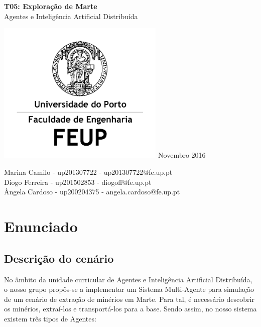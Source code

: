 \documentclass[12pt]{report}
\begin{document}
  \begin{titlepage}
    \begin{center}
        \vspace*{1cm}
        
        \Huge
        \textbf{T05: Exploração de Marte}
        \vspace{0.5cm} \ \\
        \LARGE
        Agentes e Inteligência Artificial Distribuída
        
        \vfill
        
	\includegraphics[width=0.6\textwidth]{FEUP_Logo}
	\break
        \small
        Novembro 2016
        
        \vfill
        
	\vspace{1.5cm}
        \normalsize{
	  Marina Camilo - up201307722 - up201307722@fe.up.pt \\
	  Diogo Ferreira - up201502853 - diogoff@fe.up.pt \\
	  Ângela Cardoso - up200204375 - angela.cardoso@fe.up.pt
        }
        
    \end{center}
  \end{titlepage}

\newpage
\tableofcontents

\clearpage
\chapter{Enunciado}

\section{Descrição do cenário}
No âmbito da unidade curricular de Agentes e Inteligência Artificial Distribuída, o nosso grupo propôs-se a implementar um Sistema Multi-Agente para simulação de um cenário de extração de minérios em Marte. Para tal, é necessário descobrir os minérios, extraí-los e transportá-los para a base. Sendo assim, no nosso sistema existem três tipos de Agentes:
\end{document}
